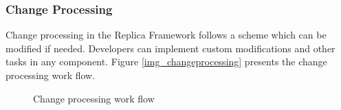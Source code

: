 \subsubsection{Change Processing}
Change processing in the Replica Framework follows a scheme which can be
modified if needed. Developers can implement custom modifications and
other tasks in any component. Figure \ref{img_changeprocessing} presents
the change processing work flow.
\begin{figure}[h]
        \caption{Change processing work flow}
        \begin{center}
\end{center}
\end{figure}
